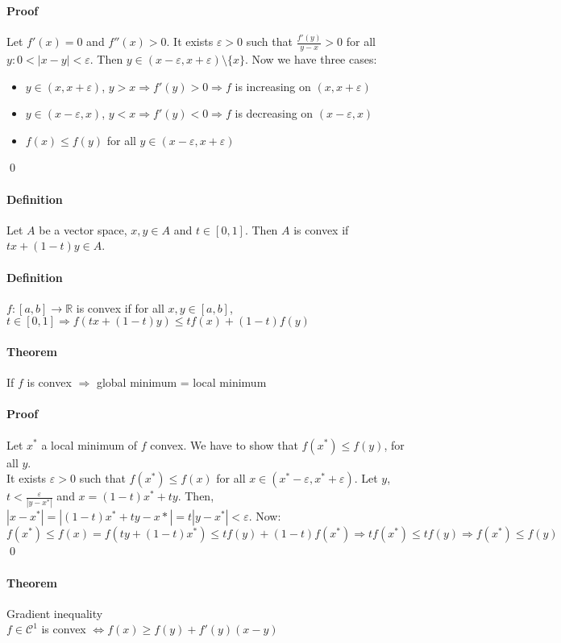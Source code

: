 \documentclass{article}
\newcommand{\functoR}[2]{#1 : #2 \rightarrow \mathbb{R}}
\newcommand{\intcc}[1]{\left[#1\right]}
\newcommand{\intoo}[1]{\left(#1\right)}
\newcommand{\C}{\mathcal{C}}
\newcommand{\Ep}{\varepsilon}
\newcommand{\Def}{\paragraph{Definition}}
\newcommand{\Theorem}{\paragraph{Theorem}}
\newcommand{\Proof}{\paragraph{Proof}}
\begin{document}
  \Proof Let $f'(x) = 0$ and $f''(x) > 0$. It exists $\Ep > 0$ such that
  $\frac{f'(y)}{y-x} > 0$ for all $y : 0 < |x-y| < \Ep$. Then $y \in
  \intoo{x-\Ep,x+\Ep}\setminus{\{x\}}$. Now we have three cases:
  \begin{itemize}
    \item $y \in \intoo{x,x+\Ep}$, $y > x \Rightarrow f'(y) > 0 \Rightarrow f$
    is increasing on $\intoo{x,x+\Ep}$
    \item $y \in \intoo{x-\Ep,x}$, $y < x \Rightarrow f'(y) < 0 \Rightarrow f$
    is decreasing on $\intoo{x-\Ep,x}$
    \item $f(x) \leq f(y)$ for all $y \in \intoo{x-\Ep,x+\Ep}$
  \end{itemize}
  \qed

  \Def Let $A$ be a vector space, $x,y \in A$ and $t \in \intcc{0,1}$. Then $A$
  is convex if $tx + (1-t)y \in A$.

  \Def $\functoR{f}{\intcc{a,b}}$ is convex if for all $x,y \in \intcc{a,b}$,
  $t \in \intcc{0,1} \Rightarrow f(tx+(1-t)y) \leq tf(x) + (1-t)f(y)$

  \Theorem If $f$ is convex $\Rightarrow$ global minimum = local minimum

  \Proof Let $x^*$ a local minimum of $f$ convex. We have to show that $f(x^*)
  \leq f(y)$, for all $y$.
\\It exists $\Ep > 0$ such that $f(x^*) \leq f(x)$ for all $x \in
  \intoo{x^*-\Ep,x^*+\Ep}$. Let $y$, $t < \frac{\Ep}{|y-x^*|}$ and $x = (1-t)x^*
  + ty$. Then, $|x-x^*| = |(1-t)x^*+ty-x*| = t|y-x^*| < \Ep$. Now:
  \begin{equation*}
    f(x^*) \leq f(x) = f(ty+(1-t)x^*) \leq tf(y) + (1-t)f(x^*) \Rightarrow
    tf(x^*) \leq tf(y) \Rightarrow f(x^*) \leq f(y)
  \end{equation*}
  \qed

  \Theorem Gradient inequality
\\$f \in \C^1$ is convex $\iff f(x) \geq f(y) + f'(y)(x-y)$
\end{document}
